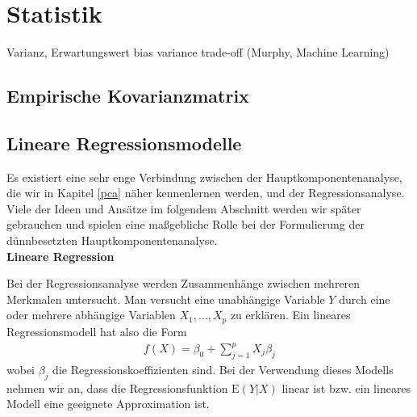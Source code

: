 
\section{Statistik}
Varianz, Erwartungswert
bias variance trade-off (Murphy, Machine Learning)
\subsection{Empirische Kovarianzmatrix}

\subsection{Lineare Regressionsmodelle}

Es existiert eine sehr enge Verbindung zwischen der Hauptkomponentenanalyse, die wir in Kapitel \ref{pca} näher kennenlernen werden, und der Regressionsanalyse. Viele der Ideen und Ansätze im folgendem Abschnitt werden wir später gebrauchen und spielen eine maßgebliche Rolle bei der Formulierung der dünnbesetzten Hauptkomponentenanalyse.\\

\textbf{Lineare Regression} \cite{hastie_elements}

Bei der Regressionsanalyse werden Zusammenhänge zwischen
mehreren Merkmalen untersucht. Man versucht eine unabhängige Variable $Y$ durch eine oder mehrere abhängige Variablen $X_1, \ldots, X_p$ zu erklären. Ein lineares Regressionsmodell hat also die Form
\begin{align}
\label{linear_model}
f(X) = \beta_0 + \sum_{j=1}^p X_j\beta_j
\end{align}
wobei $\beta_j$ die Regressionskoeffizienten sind.
Bei der Verwendung dieses Modells nehmen wir an, dass die Regressionsfunktion $\text{E}(Y|X)$ linear ist bzw. ein lineares Modell eine geeignete Approximation ist.

